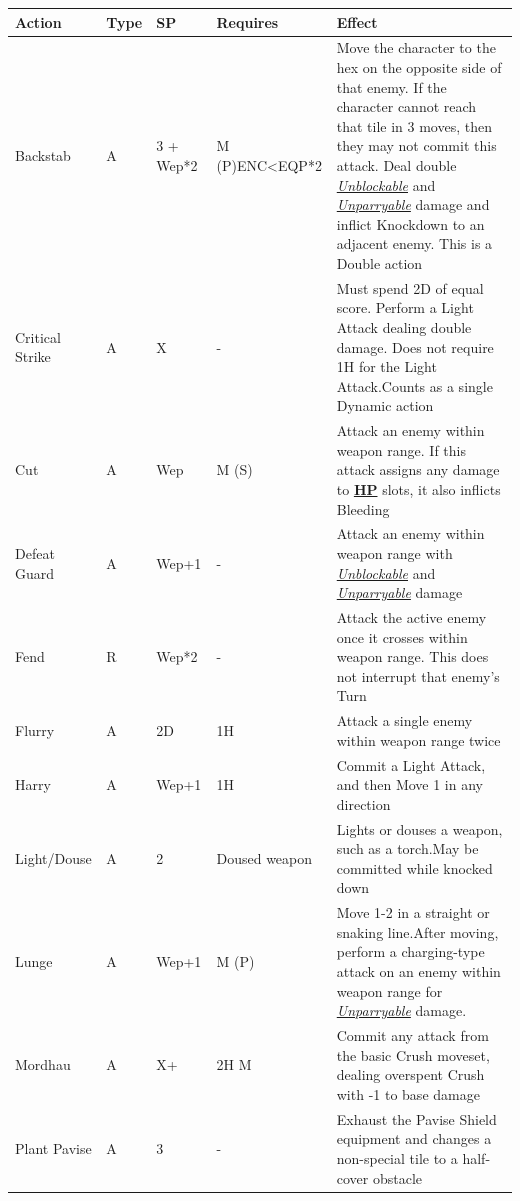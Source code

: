 \documentclass[12pt]{article}
\newcommand{\refto}[1]{\hyperlink{#1}{\textbf{#1}}}
\newcommand{\reftoit}[1]{\hyperlink{#1}{\emph{#1}}}
\begin{document}
\begin{center}
\begin{tabularx}{\textwidth}{p{}p{}p{}p{}p{}}
\hline
\rowcolor{white} \textbf{Action} & \textbf{Type} & \textbf{SP} & \textbf{Requires} & \textbf{Effect}\setcounter{rownum}{0}\\
\hline
Backstab & A & 3 + Wep*2 & M (P)\newline ENC<EQP*2 & Move the character to the hex on the opposite side of that enemy. If the character cannot reach that tile in 3 moves, then they may not commit this attack.\newline
Deal double \reftoit{Unblockable} and \reftoit{Unparryable} damage and inflict Knockdown to an adjacent enemy.\newline
This is a Double action\\
Critical Strike & A & X & - & Must spend 2D of equal score. Perform a Light Attack dealing double damage.\newline
Does not require 1H for the Light Attack.\newline Counts as a single Dynamic action\\
Cut & A & Wep & M (S) & Attack an enemy within weapon range. If this attack assigns any damage to \refto{HP} slots, it also inflicts Bleeding\\
Defeat Guard & A & Wep+1 & - & Attack an enemy within weapon range with \reftoit{Unblockable} and \reftoit{Unparryable} damage\\
Fend & R & Wep*2 & - & Attack the active enemy once it crosses within weapon range. This does not interrupt that enemy’s Turn \\
Flurry & A & 2D & 1H & Attack a single enemy within weapon range twice\\
Harry & A & Wep+1 & 1H & Commit a Light Attack, and then Move 1 in any direction \\
Light/Douse & A & 2 & Doused weapon & Lights or douses a weapon, such as a torch.\newline May be committed while knocked down\\
Lunge & A & Wep+1 & M (P) & Move 1-2 in a straight or snaking line.\newline After moving, perform a charging-type attack on an enemy within weapon range for \reftoit{Unparryable} damage.\\
Mordhau & A & X+ & 2H M & Commit any attack from the basic Crush moveset, dealing overspent Crush with -1 to base damage\\
Plant Pavise & A & 3 & - & Exhaust the Pavise Shield equipment and changes a non-special tile to a half-cover obstacle\\
\hline
\end{tabularx}
\end{center}
\end{document}
